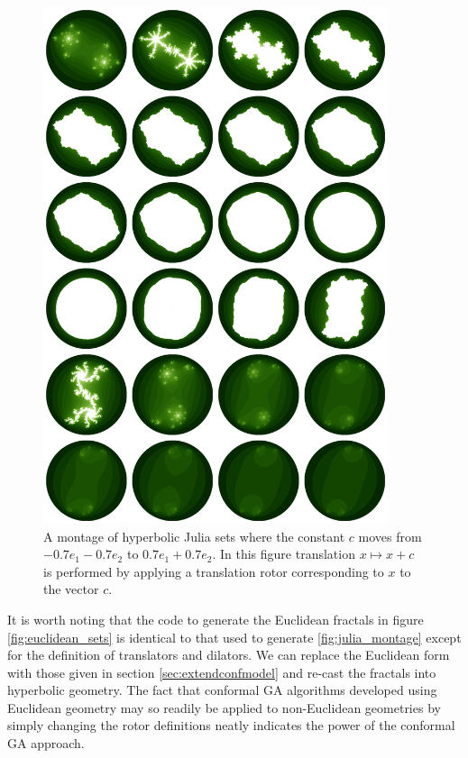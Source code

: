 \begin{figure}[p]
\centering
\includegraphics[width=0.9\textwidth]{direct_julia_noneuclid}
\caption{\label{fig:julia_montage2}
  A montage of hyperbolic Julia sets where the constant $c$ moves from $-0.7e_1 - 0.7e_2$
  to $0.7e_1 + 0.7e_2$. 
  In this figure translation $x \mapsto x + c$ is performed by applying a
  translation rotor corresponding to $x$ to the vector $c$.
}
\end{figure}

It is worth noting that the code to generate the Euclidean fractals in figure 
\ref{fig:euclidean_sets} is identical to that used to generate
\ref{fig:julia_montage} except for the definition of translators and dilators.
We can replace the Euclidean form with those given in section
\ref{sec:extendconfmodel} and re-cast the fractals into hyperbolic geometry.
The fact that conformal GA algorithms developed using Euclidean geometry may
so readily be applied to non-Euclidean geometries by simply changing the rotor
definitions neatly indicates the power of the conformal GA approach.



